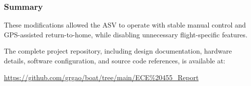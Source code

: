 \subsubsection*{Summary}

These modifications allowed the ASV to operate with stable manual control and GPS-assisted return-to-home, while disabling unnecessary flight-specific features.

\bigskip

The complete project repository, including design documentation, hardware details, software configuration, and source code references, is available at:

\begin{center}
\url{https://github.com/grgao/boat/tree/main/ECE%20455_Report}
\end{center}